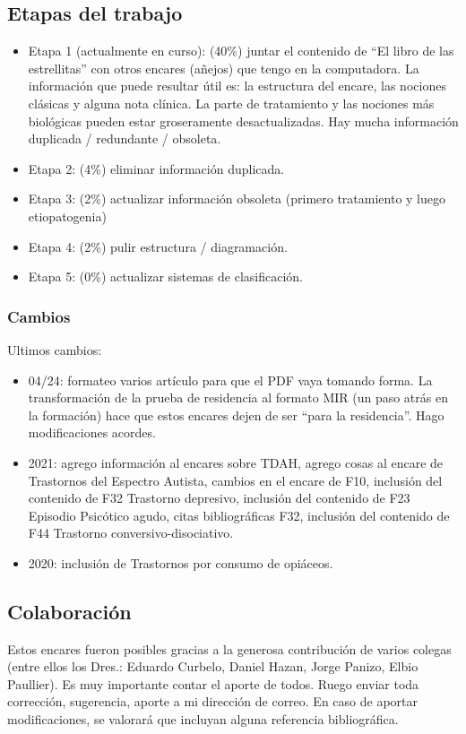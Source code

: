 \subsection*{Etapas del trabajo}
\begin{itemize}
\item Etapa 1 (actualmente en curso): \faBatteryHalf (40\%) juntar el contenido de ``El libro de las estrellitas'' con otros encares (añejos) que tengo en la computadora. La información que puede resultar útil es: la estructura del encare, las nociones clásicas y alguna nota clínica. La parte de tratamiento y las nociones más biológicas pueden estar groseramente desactualizadas. Hay mucha información duplicada / redundante / obsoleta.
\item Etapa 2: \faBatteryEmpty (4\%) eliminar información duplicada.
\item Etapa 3: \faBatteryEmpty (2\%) actualizar información obsoleta (primero tratamiento y luego etiopatogenia)
\item Etapa 4: \faBatteryEmpty (2\%) pulir estructura / diagramación.
\item Etapa 5: \faBatteryEmpty (0\%) actualizar sistemas de clasificación.
\end{itemize}
\subsubsection*{Cambios}
Ultimos cambios:
\begin{itemize}
	\item 04/24: formateo varios artículo para que el PDF vaya tomando forma. La transformación de la prueba de residencia al formato MIR (un paso atrás en la formación) hace que estos encares dejen de ser ``para la residencia''. Hago modificaciones acordes.
	\item 2021: agrego información al encares sobre TDAH, agrego cosas al encare de Trastornos del Espectro Autista, cambios en el encare de F10, inclusión del contenido de F32 Trastorno depresivo, inclusión del contenido de F23 Episodio Psicótico agudo, citas bibliográficas F32, inclusión del contenido de F44 Trastorno conversivo-disociativo.
	\item 2020: inclusión de Trastornos por consumo de opiáceos.
\end{itemize}
\subsection*{Colaboración}
Estos encares fueron posibles gracias a la generosa contribución de varios colegas (entre ellos los Dres.: Eduardo Curbelo, Daniel Hazan, Jorge Panizo, Elbio Paullier). Es muy importante contar el aporte de todos. Ruego enviar toda corrección, sugerencia, aporte a mi dirección de correo. En caso de aportar modificaciones, se valorará que incluyan alguna referencia bibliográfica.
